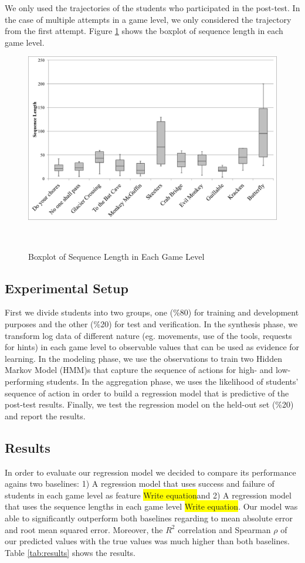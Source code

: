 \documentclass{sigchi}
\newcommand{\hl}[1]{\colorbox{yellow}{#1}}
\begin{document}
We only used the trajectories of the students who participated in the post-test.
In the case of multiple attempts in a game level, we only considered the trajectory from the first attempt.
Figure \ref{fig:boxplot} shows the boxplot of sequence length in each game level.

\begin{figure}[b]
	\centering
	\includegraphics[width=0.9\columnwidth]{figures/boxplot}
	\caption{Boxplot of Sequence Length in Each Game Level}~\label{fig:boxplot}
\end{figure}

\subsection{Experimental Setup}
First we divide students into two groups, one (\%80) for training and development purposes and the other (\%20) for test and verification.
In the synthesis phase, we transform log data of different nature (eg. movements, use of the tools, requests for hints) in each game level to observable values that can be used as evidence for learning.
In the modeling phase, we use the observations to train two Hidden Markov Model (HMM)s that capture the sequence of actions for high- and low-performing students.
In the aggregation phase, we uses the likelihood of students' sequence of action in order to build a regression model that is predictive of the post-test results.
Finally, we test the regression model on the held-out set (\%20) and report the results.


\subsection{Results}
	In order to evaluate our regression model we decided to compare its performance agains two baselines: 1) A regression model that uses success and failure of students in each game level as feature \hl{Write equation}and 2) A regression model that uses the sequence lengths in each game level \hl{Write equation}. 
	Our model was able to significantly outperform both baselines regarding to mean absolute error and root mean squared error. 
	Moreover, the $R^2$ correlation and Spearman $\rho$ of our predicted values with the true values was much higher than both baselines. Table \ref{tab:results} shows the results.
\end{document}
